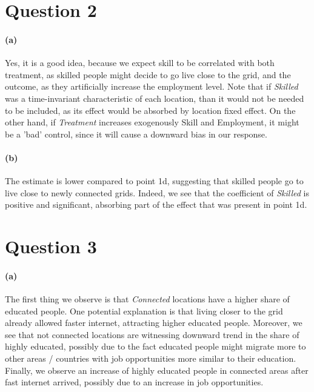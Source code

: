 \documentclass{scrartcl}
\begin{document}

\section*{Question 2}

\paragraph*{(a)}
Yes, it is a good idea, because we expect skill to be correlated with both treatment, as skilled people might decide to go live close to the grid, and the outcome, as they artificially increase the employment level. Note that if \textit{Skilled} was a time-invariant characteristic of each location, than it would not be needed to be included, as its effect would be absorbed by location fixed effect. On the other hand, if \textit{Treatment} increases exogenously Skill and Employment, it might be a 'bad' control, since it will cause a downward bias in our response.

\paragraph*{(b)}
The estimate is lower compared to point 1d, suggesting that skilled people go to live close to newly connected grids. Indeed, we see that the coefficient of \textit{Skilled} is positive and significant, absorbing part of the effect that was present in point 1d.

\section*{Question 3}

\paragraph*{(a)}
The first thing we observe is that \textit{Connected} locations have a higher share of educated people. One potential explanation is that living closer to the grid already allowed faster internet, attracting higher educated people. Moreover, we see that not connected locations are witnessing downward trend in the share of highly educated, possibly due to the fact educated people might migrate more to other areas / countries with job opportunities more similar to their education. Finally, we observe an increase of highly educated people in connected areas after fast internet arrived, possibly due to an increase in job opportunities.  
\end{document}
